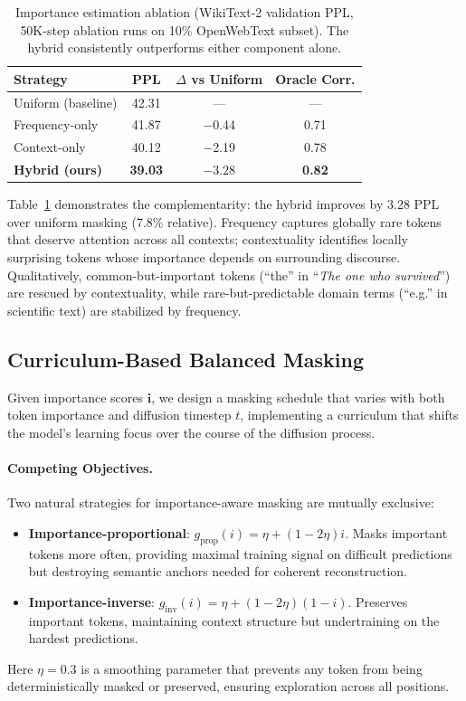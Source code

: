 \documentclass[11pt]{article}
\newcommand{\rvi}{\mathbf{i}}
\theoremstyle{remark}
\begin{document}
\begin{table}[t]
\centering
\caption{Importance estimation ablation (WikiText-2 validation PPL, 50K-step ablation runs on 10\% OpenWebText subset). The hybrid consistently outperforms either component alone.}
\label{tab:hybrid-discovery}
\small
\begin{tabular}{lccc}
\toprule
\textbf{Strategy} & \textbf{PPL} & $\Delta$ vs Uniform & \textbf{Oracle Corr.} \\
\midrule
Uniform (baseline) & 42.31 & --- & --- \\
Frequency-only & 41.87 & $-$0.44 & 0.71 \\
Context-only & 40.12 & $-$2.19 & 0.78 \\
\textbf{Hybrid (ours)} & \textbf{39.03} & $\mathbf{-3.28}$ & \textbf{0.82} \\
\bottomrule
\end{tabular}
\end{table}

Table~\ref{tab:hybrid-discovery} demonstrates the complementarity: the hybrid improves by 3.28 PPL over uniform masking (7.8\% relative). Frequency captures globally rare tokens that deserve attention across all contexts; contextuality identifies locally surprising tokens whose importance depends on surrounding discourse. Qualitatively, common-but-important tokens (``the'' in ``\textit{The one who survived}'') are rescued by contextuality, while rare-but-predictable domain terms (``e.g.'' in scientific text) are stabilized by frequency.

\subsection{Curriculum-Based Balanced Masking}
\label{sec:masking}

Given importance scores $\rvi$, we design a masking schedule that varies with both token importance and diffusion timestep $t$, implementing a curriculum that shifts the model's learning focus over the course of the diffusion process.

\paragraph{Competing Objectives.} Two natural strategies for importance-aware masking are mutually exclusive:
\begin{itemize}[leftmargin=*,itemsep=1pt,topsep=2pt]
    \item \textbf{Importance-proportional}: $g_{\text{prop}}(i) = \eta + (1{-}2\eta)i$. Masks important tokens more often, providing maximal training signal on difficult predictions but destroying semantic anchors needed for coherent reconstruction.
    \item \textbf{Importance-inverse}: $g_{\text{inv}}(i) = \eta + (1{-}2\eta)(1{-}i)$. Preserves important tokens, maintaining context structure but undertraining on the hardest predictions.
\end{itemize}
Here $\eta = 0.3$ is a smoothing parameter that prevents any token from being deterministically masked or preserved, ensuring exploration across all positions.
\end{document}
